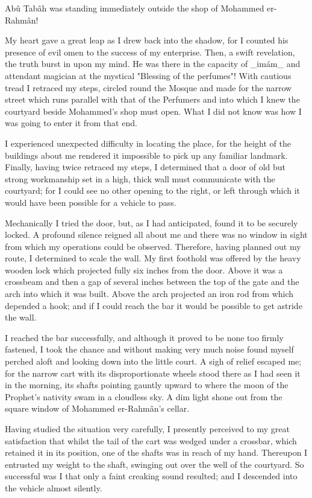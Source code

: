 Abû Tabâh was standing immediately outside the shop of Mohammed
er-Rahmân!

My heart gave a great leap as I drew back into the shadow, for I
counted his presence of evil omen to the success of my enterprise.
Then, a swift revelation, the truth burst in upon my mind. He was
there in the capacity of _imám_ and attendant magician at the mystical
"Blessing of the perfumes"! With cautious tread I retraced my steps,
circled round the Mosque and made for the narrow street which runs
parallel with that of the Perfumers and into which I knew the
courtyard beside Mohammed's shop must open. What I did not know was
how I was going to enter it from that end.

I experienced unexpected difficulty in locating the place, for the
height of the buildings about me rendered it impossible to pick up
any familiar landmark. Finally, having twice retraced my steps, I
determined that a door of old but strong workmanship set in a high,
thick wall must communicate with the courtyard; for I could see no
other opening to the right, or left through which it would have been
possible for a vehicle to pass.

Mechanically I tried the door, but, as I had anticipated, found it to
be securely locked. A profound silence reigned all about me and there
was no window in sight from which my operations could be observed.
Therefore, having planned out my route, I determined to scale the
wall. My first foothold was offered by the heavy wooden lock which
projected fully six inches from the door. Above it was a crossbeam and
then a gap of several inches between the top of the gate and the arch
into which it was built. Above the arch projected an iron rod from
which depended a hook; and if I could reach the bar it would be
possible to get astride the wall.

I reached the bar successfully, and although it proved to be none too
firmly fastened, I took the chance and without making very much noise
found myself perched aloft and looking down into the little court. A
sigh of relief escaped me; for the narrow cart with its
disproportionate wheels stood there as I had seen it in the morning,
its shafts pointing gauntly upward to where the moon of the Prophet's
nativity swam in a cloudless sky. A dim light shone out from the
square window of Mohammed er-Rahmân's cellar.

Having studied the situation very carefully, I presently perceived to
my great satisfaction that whilst the tail of the cart was wedged
under a crossbar, which retained it in its position, one of the
shafts was in reach of my hand. Thereupon I entrusted my weight to the
shaft, swinging out over the well of the courtyard. So successful was
I that only a faint creaking sound resulted; and I descended into the
vehicle almost silently.

